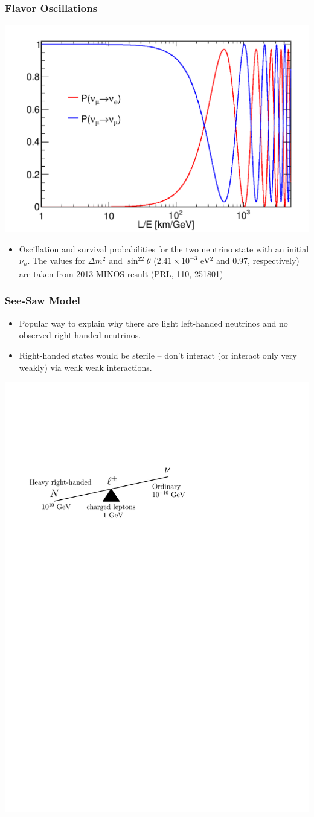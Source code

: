 \documentclass[mathserif,18pt,xcolor=table]{beamer}
\begin{document}
\begin{frame}
  \frametitle{Flavor Oscillations}
  \begin{center}
    \includegraphics[width=.6\linewidth]{../figures/oscillation_prob.pdf}    
  \end{center}
  \begin{itemize}
\item Oscillation and survival probabilities for the two neutrino state with an initial $\nu_{\mu}$. The values for $\Delta m^2$ and $\sin^22\theta$ ($2.41\times 10^{-3}$ eV$^2$ and 0.97, respectively) are taken from 2013 MINOS result (PRL, 110, 251801)    
  \end{itemize}
\end{frame}

\begin{frame}
  \frametitle{See-Saw Model}
  \begin{itemize}
  \item Popular way to explain why there are light left-handed neutrinos and no observed right-handed neutrinos.
  \item Right-handed states would be sterile -- don't interact (or interact only very weakly) via weak weak interactions.
  \end{itemize}
  \begin{center}
    \includegraphics[width=.75\linewidth]{../figures/seesaw.pdf}
  \end{center}
\end{frame}
\end{document}
